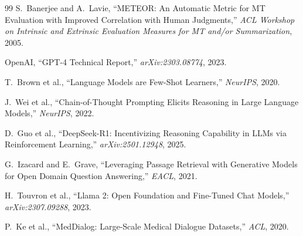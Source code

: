 \documentclass[conference]{IEEEtran}
\begin{document}
\begin{thebibliography}{99}
S.~Banerjee and A.~Lavie, ``METEOR: An Automatic Metric for MT Evaluation with Improved
Correlation with Human Judgments,'' \textit{ACL Workshop on Intrinsic and Extrinsic
Evaluation Measures for MT and/or Summarization}, 2005.

OpenAI, ``GPT-4 Technical Report,''
\textit{arXiv:2303.08774}, 2023.

T.~Brown et al., ``Language Models are Few-Shot Learners,'' \textit{NeurIPS}, 2020.

J.~Wei et al., ``Chain-of-Thought Prompting Elicits Reasoning in Large Language Models,''
\textit{NeurIPS}, 2022.

D.~Guo et al., ``DeepSeek-R1: Incentivizing Reasoning Capability in LLMs via
Reinforcement Learning,'' \textit{arXiv:2501.12948}, 2025.

G.~Izacard and E.~Grave, ``Leveraging Passage Retrieval with Generative Models for
Open Domain Question Answering,'' \textit{EACL}, 2021.

H.~Touvron et al., ``Llama 2: Open Foundation and Fine-Tuned Chat Models,''
\textit{arXiv:2307.09288}, 2023.

P.~Ke et al., ``MedDialog: Large-Scale Medical Dialogue Datasets,'' \textit{ACL}, 2020.

\end{thebibliography}
\end{document}
